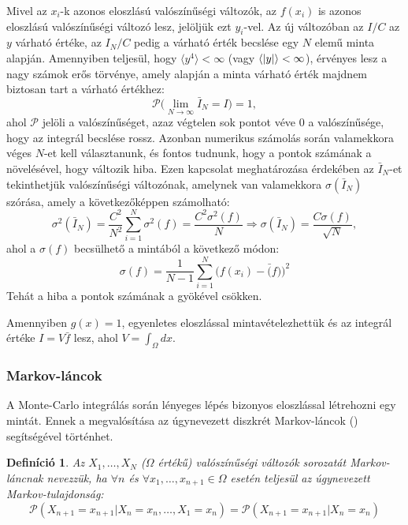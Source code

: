 \documentclass[11pt,a4paper]{article}
\numberwithin{equation}{subsection}
\numberwithin{figure}{section}
\newtheorem{definition}{Definíció}[section]
\begin{document}
Mivel az $x_i$-k azonos eloszlású valószínűségi változók, az $f(x_i)$ is azonos eloszlású valószínűségi változó lesz, jelöljük ezt $y_i$-vel. Az új változóban az $I/C$ az $y$ várható értéke, az $I_N/C$ pedig a várható érték becslése egy $N$ elemű minta alapján. Amennyiben teljesül, hogy $\langle y^4\rangle<\infty$ (vagy $\langle \abs{y}\rangle<\infty$), érvényes lesz a nagy számok erős törvénye, amely alapján a minta várható érték majdnem biztosan tart a várható értékhez:
\begin{equation}
\mathcal{P}\Big(\lim_{N\rightarrow\infty}\bar{I}_N=I\Big)=1,
\end{equation}
ahol $\mathcal{P}$ jelöli a valószínűséget, azaz végtelen sok pontot véve $0$ a valószínűsége, hogy az integrál becslése rossz. Azonban numerikus számolás során valamekkora véges $N$-et kell választanunk, és fontos tudnunk, hogy a pontok számának a növelésével, hogy változik hiba. Ezen kapcsolat meghatározása érdekében az $\bar{I}_{N}$-et tekinthetjük valószínűségi változónak, amelynek van valamekkora $\sigma({\bar{I}_N})$ szórása, amely a következőképpen számolható:
\begin{equation}
\sigma^2({\bar{I}_N})=\frac{C^2}{N^2}\sum_{i=1}^N\sigma^2(f)=\frac{C^2\sigma^2(f)}{N}\Longrightarrow \sigma(\bar{I}_N)=\frac{C\sigma(f)}{\sqrt{N}},
\end{equation}
ahol a $\sigma(f)$ becsülhető a mintából a következő módon:
\begin{equation}
\sigma(f)=\frac{1}{N-1}\sum_{i=1}^N\big(f(x_i)-\bar(f)\big)^2
\end{equation}
Tehát a hiba a pontok számának a gyökével csökken.

Amennyiben $g(x)=1$, egyenletes eloszlással mintavételezhettük és az integrál értéke $I=V\bar{f}$ lesz, ahol $V=\int_\Omega dx$.

\subsubsection{Markov-láncok}

A Monte-Carlo integrálás során lényeges lépés bizonyos eloszlással létrehozni egy mintát. Ennek a megvalósítása az úgynevezett diszkrét Markov-láncok (\cite{norris1998markov}) segítségével történhet. 

\begin{definition}
Az $X_1,\dots,X_N$ ($\Omega$ értékű) valószínűségi változók sorozatát Markov-láncnak nevezzük, ha $\forall n$ és $\forall x_1,\dots,x_{n+1}\in\Omega$ esetén teljesül az úgynevezett Markov-tulajdonság:
\begin{equation}
\mathcal{P}(X_{n+1}=x_{n+1}|X_n=x_n,\dots,X_1=x_n)=\mathcal{P}(X_{n+1}=x_{n+1}|X_n=x_n)
\end{equation}
\end{definition}
\end{document}
